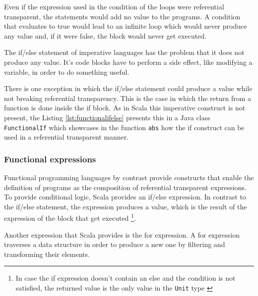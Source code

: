 \documentclass[../main.tex]{subfiles}
\begin{document}
Even if the expression used in the condition of the loops were referential
transparent, the statements would add no value to the programs. A condition that
evaluates to true would lead to an infinite loop which would never produce any
value and, if it were false, the block would never get executed.

The if/else statement of imperative languages has the problem that it does not
produce any value. It's code blocks have to perform a side effect, like modifying
a variable, in order to do something useful.

There is one exception in which the if/else statement could produce a value
while not breaking referential transparency. This is the case in which the
return from a function is done inside the if block. As in Scala this imperative
construct is not present, the Listing \ref{lst:functionalifelse} presents this in
a Java class \texttt{FunctionalIf} which showcases in the function
\texttt{abs} how the if construct can be used in a referential transparent manner.




\subsubsection{Functional expressions} Functional programming languages by
contrast provide constructs that enable the definition of programs as the
composition of referential transparent expressions. To provide conditional logic, Scala provides an if/else
expression. In contrast to the if/else statement, the expression produces a
value, which is the result of the expression of the block that get executed
\footnote{In case the if expression doesn't contain an else and the
condition is not satisfied, the returned value is the only value in the \texttt{Unit} type
\autocite{ScalaScala.Unit}}.

Another expression that Scala provides is the for expression. A for expression
traverses a data structure in order to produce a new one by filtering and
transforming their elements.
\end{document}
